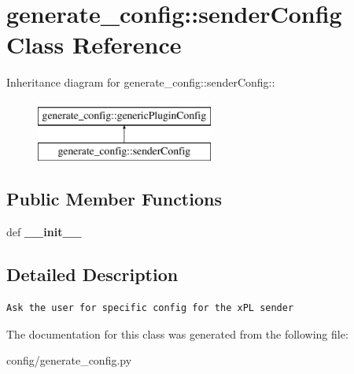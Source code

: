 \hypertarget{classgenerate__config_1_1senderConfig}{
\section{generate\_\-config::senderConfig Class Reference}
\label{classgenerate__config_1_1senderConfig}
}
Inheritance diagram for generate\_\-config::senderConfig::\begin{figure}[H]
\begin{center}
\leavevmode
\includegraphics[height=2cm]{classgenerate__config_1_1senderConfig}
\end{center}
\end{figure}
\subsection*{Public Member Functions}
\begin{CompactItemize}
\item 
\hypertarget{classgenerate__config_1_1senderConfig_0eaa1e44dfc6199842d784e2211a6f67}{
def \textbf{\_\-\_\-init\_\-\_\-}}
\label{classgenerate__config_1_1senderConfig_0eaa1e44dfc6199842d784e2211a6f67}

\end{CompactItemize}


\subsection{Detailed Description}


\footnotesize\begin{verbatim}
Ask the user for specific config for the xPL sender
\end{verbatim}
\normalsize
 

The documentation for this class was generated from the following file:\begin{CompactItemize}
\item 
config/generate\_\-config.py\end{CompactItemize}

